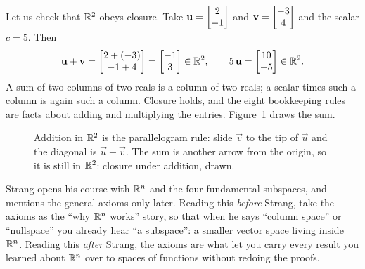\begin{example}\label{ch11:r2-check}
Let us check that $\mathbb{R}^2$ obeys closure. Take
$\mathbf{u} = \begin{bmatrix}2\\-1\end{bmatrix}$ and $\mathbf{v} = \begin{bmatrix}-3\\4\end{bmatrix}$ and the scalar $c = 5$. Then
\[
\mathbf{u} + \mathbf{v} = \begin{bmatrix}2 + (-3)\\ -1 + 4\end{bmatrix} = \begin{bmatrix}-1\\3\end{bmatrix} \in \mathbb{R}^2,
\qquad
5\,\mathbf{u} = \begin{bmatrix}10\\-5\end{bmatrix} \in \mathbb{R}^2.
\]
A sum of two columns of two reals is a column of two reals; a scalar times such a column
is again such a column. Closure holds, and the eight bookkeeping rules are
facts about adding and multiplying the entries. Figure~\ref{ch11:fig-r2add} draws the sum.
\end{example}

\begin{figure}[htbp]
\centering
{}
\caption{Addition in $\mathbb{R}^2$ is the parallelogram rule: slide $\vec{v}$ to the tip of
$\vec{u}$ and the diagonal is $\vec{u}+\vec{v}$. The sum is another arrow from the origin,
so it is still in $\mathbb{R}^2$: closure under addition, drawn.}
\label{ch11:fig-r2add}
\end{figure}

\begin{strangbox}
Strang opens his course with $\mathbb{R}^n$ and the four fundamental subspaces, and mentions
the general axioms only later. Reading this \emph{before} Strang,
take the axioms as the ``why $\mathbb{R}^n$ works'' story, so that when he says ``column space'' or
``nullspace'' you already hear ``a subspace'': a smaller vector space living inside
$\mathbb{R}^n$. Reading this \emph{after} Strang, the axioms are what let you carry every result
you learned about $\mathbb{R}^n$ over to spaces of functions without redoing the proofs.
\end{strangbox}

